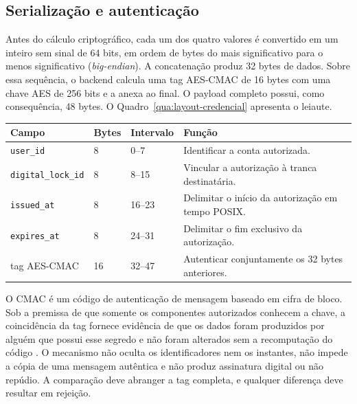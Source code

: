 \subsection{Serialização e autenticação}

Antes do cálculo criptográfico, cada um dos quatro valores é convertido em um inteiro sem sinal de 64 bits, em ordem de bytes do mais significativo para o menos significativo (\textit{big-endian}). A concatenação produz 32 bytes de dados. Sobre essa sequência, o backend calcula uma tag AES-CMAC de 16 bytes com uma chave AES de 256 bits e a anexa ao final. O payload completo possui, como consequência, 48 bytes. O Quadro~\ref{qua:layout-credencial} apresenta o leiaute.

\begin{quadro}[htb]
    \caption{Leiaute binário da credencial do FLIKE}
    \label{qua:layout-credencial}
    \small
    \setlength{\tabcolsep}{4pt}
    \begin{tabular}{|p{}|p{}|p{}|p{}|}
        \hline
        \textbf{Campo} & \textbf{Bytes} & \textbf{Intervalo} & \textbf{Função} \\ \hline
        \texttt{user\_id} & 8 & 0--7 & Identificar a conta autorizada. \\ \hline
        \texttt{digital\_lock\_id} & 8 & 8--15 & Vincular a autorização à tranca destinatária. \\ \hline
        \texttt{issued\_at} & 8 & 16--23 & Delimitar o início da autorização em tempo POSIX. \\ \hline
        \texttt{expires\_at} & 8 & 24--31 & Delimitar o fim exclusivo da autorização. \\ \hline
        tag AES-CMAC & 16 & 32--47 & Autenticar conjuntamente os 32 bytes anteriores. \\ \hline
    \end{tabular}
\end{quadro}

O CMAC é um código de autenticação de mensagem baseado em cifra de bloco. Sob a premissa de que somente os componentes autorizados conhecem a chave, a coincidência da tag fornece evidência de que os dados foram produzidos por alguém que possui esse segredo e não foram alterados sem a recomputação do código \cite{nist2005cmac}. O mecanismo não oculta os identificadores nem os instantes, não impede a cópia de uma mensagem autêntica e não produz assinatura digital ou não repúdio. A comparação deve abranger a tag completa, e qualquer diferença deve resultar em rejeição.

